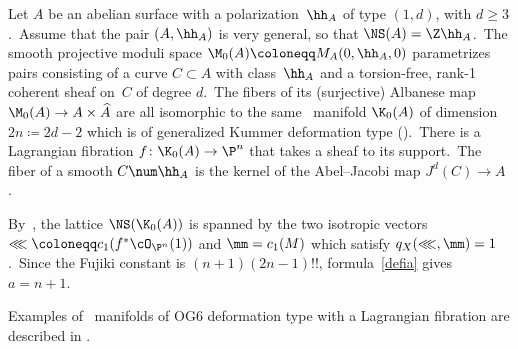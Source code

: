 \begin{exam}
\notready\label{ex:Kumn}
 Let $A$ be an abelian surface with a polarization~$\hh_A$ of type $(1,d)$, with $ d\ge 3$.\
Assume that the pair $(A,\hh_A)$ is very general, so that $\NS(A)=\Z \hh_A$.\
The smooth projective moduli space  $\M_0(A)\coloneqq M_{A}(0,\hh_A,0)$ parametrizes pairs consisting of a curve $C\subset A$ with class~$\hh_A$ and a torsion-free, rank-1 coherent sheaf on~$C$ of degree $d$.\
The fibers of its (surjective) Albanese map $\M_0(A)\to A\times \widehat A$   are all isomorphic to the same \hk\ manifold $\K_0(A)$ of dimension $2n\coloneqq 2d-2$ which is of generalized Kummer deformation type (\cite[Theorem~0.2(1)]{yos:moduli}).\
There is a Lagrangian fibration
$
f\colon \K_0(A) \to \P^{n}
$
that takes a sheaf to its support.\
The fiber of a smooth $C\num \hh_A$ is the kernel of the Abel--Jacobi map $J^{d}(C)\to A$.\

By~\cite[Theorem 0.2(2)]{yos:moduli}, the lattice $\NS(\K_0(A))$ is spanned by the two isotropic vectors $\lll\coloneqq c_1(f^*\cO_{\P^{n}}(1))$ and $  \mm=c_1(M)$ which satisfy $q_X(\lll, \mm)=1$.\
Since the Fujiki constant is $(n+1) (2n-1)!!$, formula~\eqref{defia} gives $a=n+1$.
\end{exam}

\begin{exam}
\notready
Examples of \hk\ manifolds of  OG6 deformation type with a Lagrangian fibration are described in \cite{rap}.
\end{exam}

